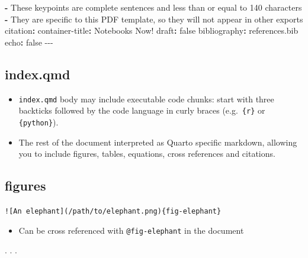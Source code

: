 \documentclass[
  letterpaper,
  DIV=11,
  numbers=noendperiod]{scrartcl}
\newenvironment{Shaded}{\begin{snugshade}}{\end{snugshade}}
\newcommand{\AttributeTok}[1]{\textcolor[rgb]{0.40,0.45,0.13}{#1}}
\newcommand{\CharTok}[1]{\textcolor[rgb]{0.13,0.47,0.30}{#1}}
\newcommand{\FunctionTok}[1]{\textcolor[rgb]{0.28,0.35,0.67}{#1}}
\newcommand{\KeywordTok}[1]{\textcolor[rgb]{0.00,0.23,0.31}{\textbf{#1}}}
\newcommand{\PreprocessorTok}[1]{\textcolor[rgb]{0.68,0.00,0.00}{#1}}
\newcommand{\StringTok}[1]{\textcolor[rgb]{0.13,0.47,0.30}{#1}}
\providecommand{\tightlist}{%
  \setlength{\itemsep}{0pt}\setlength{\parskip}{0pt}}\usepackage{longtable,booktabs,array}
\begin{document}
\begin{Shaded}
\begin{Highlighting}[]
\AttributeTok{  }\KeywordTok{{-}}\AttributeTok{ These keypoints are complete sentences and less than or equal to 140 characters}
\AttributeTok{  }\KeywordTok{{-}}\AttributeTok{ }\StringTok{\textquotesingle{}They are specific to this PDF template, so they will not appear in other exports\textquotesingle{}}
\FunctionTok{citation}\KeywordTok{:}
\AttributeTok{  }\FunctionTok{container{-}title}\KeywordTok{:}\AttributeTok{ Notebooks Now!}
\FunctionTok{draft}\KeywordTok{:}\AttributeTok{ }\CharTok{false}
\FunctionTok{bibliography}\KeywordTok{:}\AttributeTok{ references.bib}
\FunctionTok{echo}\KeywordTok{:}\AttributeTok{ }\CharTok{false}
\PreprocessorTok{{-}{-}{-}}
\end{Highlighting}
\end{Shaded}

\subsection{index.qmd}\label{index.qmd-2}

\begin{itemize}
\item
  \texttt{index.qmd} body may include executable code chunks: start with
  three backticks followed by the code language in curly braces
  (e.g.~\texttt{\textasciigrave{}\textasciigrave{}\textasciigrave{}\{r\}}
  or
  \texttt{\textasciigrave{}\textasciigrave{}\textasciigrave{}\{python\}}).
\item
  The rest of the document interpreted as Quarto specific markdown,
  allowing you to include figures, tables, equations, cross references
  and citations.
\end{itemize}

\subsection{figures}\label{figures}

\texttt{!{[}An\ elephant{]}(/path/to/elephant.png)\{fig-elephant\}}

\begin{itemize}
\tightlist
\item
  Can be cross referenced with \texttt{@fig-elephant} in the document
\end{itemize}

. . .
\end{document}
